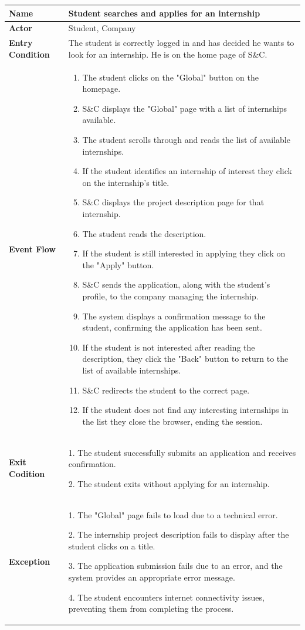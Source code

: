 \begin{longtable}{|p{}|p{}|}
\hline
\textbf{Name} &  Student searches and applies for an internship\\
\hline
\textbf{Actor} &  Student, Company\\
\hline
\textbf{Entry Condition} &  The student is correctly logged in and has decided he wants to look for an internship. He is on the home page of S\&C.\\
\hline
\textbf{Event Flow} &  
\begin{enumerate}
    \item  The student clicks on the "Global" button on the homepage.
    \item S\&C displays the "Global" page with a list of internships available.
    \item The student scrolls through and reads the list of available internships.
    \item If the student identifies an internship of interest they click on the internship's title.
    \item S\&C displays the project description page for that internship.
    \item The student reads the description.
    \item If the student is still interested in applying they click on the "Apply" button.
    \item S\&C sends the application, along with the student's profile, to the company managing the internship.
    \item The system displays a confirmation message to the student, confirming the application has been sent.
    \item If the student is not interested after reading the description, they click the "Back" button to return to the list of available internships.
    \item S\&C redirects the student to the correct page.
    \item  If the student does not find any interesting internships in the list they close the browser, ending the session.
\end{enumerate} \\
\hline
\textbf{Exit Codition} &  
1. The student successfully submits an application and receives confirmation.

2. The student exits without applying for an internship.\\
\hline
\textbf{Exception} &  
1. The "Global" page fails to load due to a technical error.	

2. The internship project description fails to display after the student clicks on a title.

3. The application submission fails due to an error, and the system provides an appropriate error message.	

4. The student encounters internet connectivity issues, preventing them from completing the process.\\
\hline
\end{longtable}

